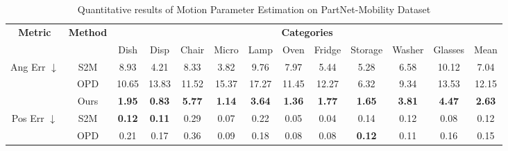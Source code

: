

\begin{table*}
\footnotesize
\centering
\caption{Quantitative results of Motion Parameter Estimation on PartNet-Mobility Dataset \cite{xiang2020sapien}}
\label{tab: partnet_sapian_quant}
\begin{tabular}{c|c|ccccccccccc}
\hline
\multirow{2}{*}{\textbf{Metric}}                            & \multirow{2}{*}{\textbf{Method}} & \multicolumn{11}{c}{\textbf{Categories}}                                                                                                                      \\ \cline{3-13} 
                                                   &                         & Dish & Disp & Chair & Micro & Lamp & Oven & Fridge & Storage & Washer & \multicolumn{1}{c|}{Glasses} & Mean \\ \hline
\multirow{3}{*}{Ang Err $\downarrow$} & S2M            &   8.93         &    4.21    &      8.33        &    3.82       &  9.76   &    7.97   &       5.44        &         5.28         &       6.58         & \multicolumn{1}{c|}{ 10.12}      &   7.04  \\
                                                   & OPD                     &     10.65       &     13.83    &      11.52        &    15.37       &  17.27    &   11.45   &    12.27          &        6.32         &        9.34        & \multicolumn{1}{c|}{13.53}      &   12.15   \\
                                                   & Ours                  &     \cellcolor{blue!15}   \textbf{1.95}      &    \cellcolor{blue!15}\textbf{0.83}     &      \cellcolor{blue!15}\textbf{5.77}        &     \cellcolor{blue!15}\textbf{1.14}      &  \cellcolor{blue!15}\textbf{3.64}   &   \cellcolor{blue!15}\textbf{1.36}   &      \cellcolor{blue!15}\textbf{1.77}        &      \cellcolor{blue!15}\textbf{1.65}            &   \cellcolor{blue!15}\textbf{3.81}             & \multicolumn{1}{c|}{\cellcolor{blue!15}\textbf{4.47}}      &  \cellcolor{blue!15}\textbf{2.63}    \\ \hline
\multirow{3}{*}{Pos Err $\downarrow$} & S2M            &    \cellcolor{blue!15} \textbf{0.12}       &    \cellcolor{blue!15} \textbf{0.11}     &    0.29          &      0.07     &    0.22  &   0.05   &        0.04      &          0.14         &  0.12              & \multicolumn{1}{c|}{ 0.08}      &  0.12    \\
                                                   & OPD                     &    0.21        & 0.17         &      0.36        &    0.09       &    0.18   &   0.08   &     0.08         &        \cellcolor{blue!15}\textbf{0.12}          &      0.11          & \multicolumn{1}{c|}{0.16}      &    0.15  \\

\end{tabular}
\end{table*}
